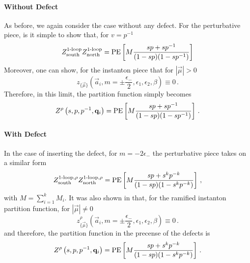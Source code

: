 \documentclass[main.tex]{subfiles}
\begin{document}
\paragraph{Without Defect}
As before, we again consider the case without any defect. For the perturbative piece, is it simple to show that, for $v=p^{-1}$
\begin{equation}
Z^{\text{1-loop}}_{\text{south}}Z^{\text{1-loop}}_{\text{north}}=\operatorname{\mathrm{PE}}\left[M\frac{sp+sp^{-1}}{(1-sp)(1-sp^{-1})}\right]
\end{equation}
Moreover, one can show, for the instanton piece that for $|\vec{\mu}|>0$
\begin{equation}
z_{\{\vec{\mu}\}}\left(\vec{a}_i,m=\pm\frac{\epsilon_-}{2},\epsilon_1,\epsilon_2,\beta\right)\equiv0\,.
\end{equation}
Therefore, in this limit, the partition function simply becomes
\begin{equation}
Z^{\rho}\left(s,p,p^{-1},\mathbf{q}_i\right)=\operatorname{\mathrm{PE}}\left[M\frac{sp+sp^{-1}}{(1-sp)(1-sp^{-1})}\right]\,.
\end{equation}
\paragraph{With Defect}
In the case of inserting the defect, for $m=-2\epsilon_-$ the perturbative piece takes on a similar form
\begin{equation}
Z_{\text{south}}^{\text{1-loop},\rho}Z_{\text{north}}^{\text{1-loop},\rho}=\operatorname{\mathrm{PE}}\left[M\frac{sp+s^kp^{-k}}{(1-sp)(1-s^kp^{-k})}\right]\,,
\end{equation}
with $M=\sum_{i=1}^kM_i$.
It was also shown in \cite{Bullimore:2014upa} that, for the ramified instanton partition function, for $|\vec{\mu}|\neq0$
\begin{equation}
z^{\rho}_{\{\vec{\mu}\}}\left(\vec{a}_i,m=\pm\frac{\epsilon_-}{2},\epsilon_1,\epsilon_2,\beta\right)\equiv0\,.
\end{equation}
and therefore, the partition function in the precense of the defects is
\begin{equation}
Z^{\rho}\left(s,p,p^{-1},\mathbf{q}_i\right)=\operatorname{\mathrm{PE}}\left[M\frac{sp+s^kp^{-k}}{(1-sp)(1-s^kp^{-k})}\right]\,.
\end{equation}
\end{document}
